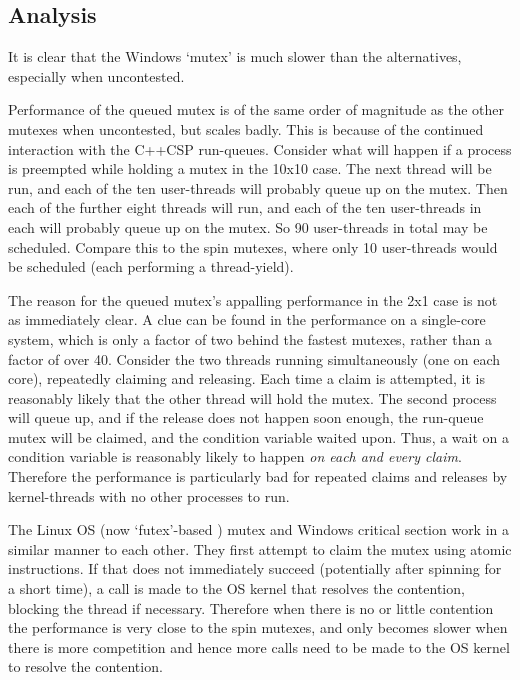\documentclass[12pt]{IOS-Book-Article-CPA-2007}
\begin{document}
\newpage

\subsection{Analysis}

\label{sec-mutex-analysis}

It is clear that the Windows `mutex' is much slower than the alternatives, especially when uncontested.  

Performance of the queued mutex is of the same order of magnitude as the other mutexes when uncontested, but scales badly.  This is because of the continued interaction
with the C++CSP run-queues.  Consider what will happen if a process is preempted while holding a mutex in the 10x10 case.  The next thread will be run,
and each of the ten user-threads will probably queue up on the mutex.  Then each of the further eight threads will run, and each of the ten 
user-threads in each will probably queue up on the mutex.  So 90 user-threads in total may be scheduled.  Compare this to the spin mutexes, where 
only 10 user-threads would be scheduled (each performing a thread-yield).  

The reason for the queued mutex's appalling performance in the 2x1 case is not as immediately clear.  A clue can be found in the performance on a 
single-core system, which is only a factor of two behind the fastest mutexes, rather than a factor of over 40.  Consider the two threads running 
simultaneously (one on each core), repeatedly claiming and releasing.  Each time a claim is attempted, it is reasonably likely that the other thread 
will hold the mutex.  The second process will queue up, and if the release does not happen soon enough, the run-queue mutex will be claimed, and the 
condition variable waited upon.  Thus, a wait on a condition variable is reasonably likely to happen \textit{on each and every claim}.  Therefore the 
performance is particularly bad for repeated claims and releases by kernel-threads with no other processes to run.

The Linux OS (now `futex'-based \cite{futex-tricky}) mutex and Windows critical section work in a similar manner to each other.  They first attempt to claim the mutex using 
atomic instructions.  If that does not immediately succeed (potentially after spinning for a short time), a call is made to the OS kernel that 
resolves the contention, blocking the thread if necessary.  Therefore when there is no or little contention the performance is very close to the spin 
mutexes, and only becomes slower when there is more competition and hence more calls need to be made to the OS kernel to resolve the contention.
\end{document}
